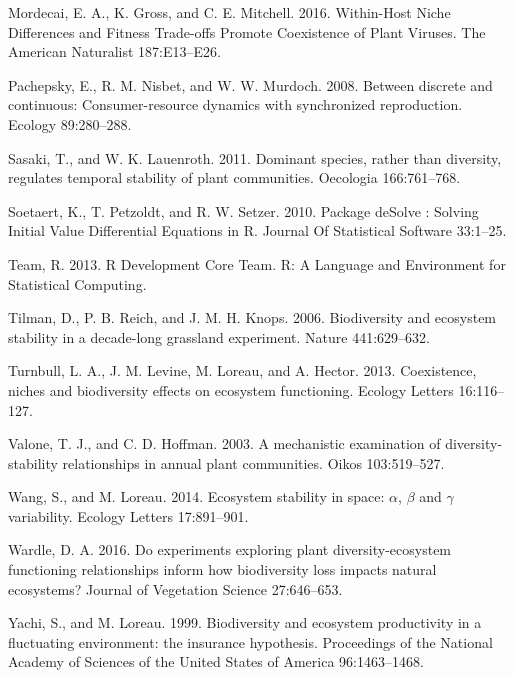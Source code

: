 \documentclass[12pt,]{article}
\begin{document}
Mordecai, E. A., K. Gross, and C. E. Mitchell. 2016. Within-Host Niche
Differences and Fitness Trade-offs Promote Coexistence of Plant Viruses.
The American Naturalist 187:E13--E26.

Pachepsky, E., R. M. Nisbet, and W. W. Murdoch. 2008. Between discrete
and continuous: Consumer-resource dynamics with synchronized
reproduction. Ecology 89:280--288.

Sasaki, T., and W. K. Lauenroth. 2011. Dominant species, rather than
diversity, regulates temporal stability of plant communities. Oecologia
166:761--768.

Soetaert, K., T. Petzoldt, and R. W. Setzer. 2010. Package deSolve :
Solving Initial Value Differential Equations in R. Journal Of
Statistical Software 33:1--25.

Team, R. 2013. R Development Core Team. R: A Language and Environment
for Statistical Computing.

Tilman, D., P. B. Reich, and J. M. H. Knops. 2006. Biodiversity and
ecosystem stability in a decade-long grassland experiment. Nature
441:629--632.

Turnbull, L. A., J. M. Levine, M. Loreau, and A. Hector. 2013.
Coexistence, niches and biodiversity effects on ecosystem functioning.
Ecology Letters 16:116--127.

Valone, T. J., and C. D. Hoffman. 2003. A mechanistic examination of
diversity-stability relationships in annual plant communities. Oikos
103:519--527.

Wang, S., and M. Loreau. 2014. Ecosystem stability in space: \(\alpha\),
\(\beta\) and \(\gamma\) variability. Ecology Letters 17:891--901.

Wardle, D. A. 2016. Do experiments exploring plant diversity-ecosystem
functioning relationships inform how biodiversity loss impacts natural
ecosystems? Journal of Vegetation Science 27:646--653.

Yachi, S., and M. Loreau. 1999. Biodiversity and ecosystem productivity
in a fluctuating environment: the insurance hypothesis. Proceedings of
the National Academy of Sciences of the United States of America
96:1463--1468.
\end{document}
